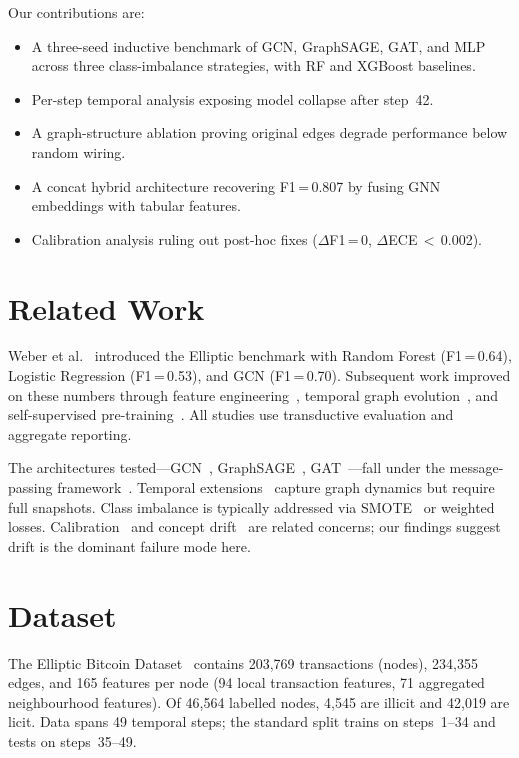 \documentclass[runningheads]{llncs}
\begin{document}
Our contributions are:
\begin{itemize}[leftmargin=*,nosep]
\item A three-seed inductive benchmark of GCN, GraphSAGE, GAT, and MLP
  across three class-imbalance strategies, with RF and XGBoost baselines.
\item Per-step temporal analysis exposing model collapse after step~42.
\item A graph-structure ablation proving original edges degrade
  performance below random wiring.
\item A concat hybrid architecture recovering F1\,=\,0.807 by fusing
  GNN embeddings with tabular features.
\item Calibration analysis ruling out post-hoc fixes
  ($\Delta$F1\,=\,0, $\Delta$ECE\,$<$\,0.002).
\end{itemize}

\section{Related Work}

Weber et al.~\citep{weber2019} introduced the Elliptic benchmark with
Random Forest (F1\,=\,0.64), Logistic Regression (F1\,=\,0.53), and GCN
(F1\,=\,0.70).  Subsequent work improved on these numbers through
feature engineering~\citep{alarab2020}, temporal graph
evolution~\citep{pareja2020evolvegcn}, and self-supervised
pre-training~\citep{lo2023}.  All studies use transductive evaluation
and aggregate reporting.

The architectures tested---GCN~\citep{kipf2017},
GraphSAGE~\citep{hamilton2017}, GAT~\citep{velickovic2018}---fall under
the message-passing framework~\citep{gilmer2017mpnn}.  Temporal
extensions~\citep{pareja2020evolvegcn,sankar2020,you2022roland} capture
graph dynamics but require full snapshots.  Class imbalance is typically
addressed via SMOTE~\citep{chawla2002smote} or weighted losses.
Calibration~\citep{guo2017calibration} and concept
drift~\citep{gama2014survey,lu2018drift,quinonero2009shift} are related
concerns; our findings suggest drift is the dominant failure mode here.

\section{Dataset}

The Elliptic Bitcoin Dataset~\citep{weber2019} contains 203,769
transactions (nodes), 234,355 edges, and 165 features per node (94
local transaction features, 71 aggregated neighbourhood features).
Of 46,564 labelled nodes, 4,545 are illicit and 42,019 are licit.
Data spans 49 temporal steps; the standard split trains on steps~1--34
and tests on steps~35--49.
\end{document}

